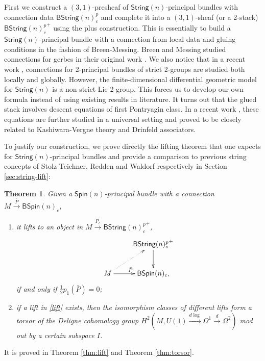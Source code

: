 \documentclass[letterpaper,10pt, oneside]{article} %
\newtheorem{thm}{Theorem}[section]
\newcommand{\bstringnp}{\mathsf{BString}(n)^p_{c}} %
\newcommand{\bstringnpp}{{\mathsf{BString}(n)^p_{c}}^+} %
\newcommand{\String}{\mathsf{String}}%
\newcommand{\Spin}{\mathsf{Spin}}%
\newcommand{\BSpin}{\mathsf{BSpin}}%
\begin{document}
First we  construct a $(3,1)$-presheaf of $\String(n)$-principal bundles with connection data $\bstringnp$ and complete it into a $(3,1)$-sheaf (or a 2-stack) $\bstringnpp$ using the plus construction. This is essentially to build a $\String(n)$-principal bundle with a connection from local data and gluing conditions in the fashion of Breen-Messing. Breen and Messing studied connections for gerbes in their original work  \cite{breen-messing}. We also notice that in a recent work \cite{waldorf:global},  connections for 2-principal bundles of strict 2-groups are studied both locally and globally. However, the finite-dimensional differential geometric model for $\String(n)$ is a non-strict Lie 2-group. This forces us to develop our own formula instead of using existing results in literature.
It turns out that the glued stack involves descent equations of first Pontryagin class. In a recent work \cite{AFXZ}, these equations are further studied in a universal setting and proved to be closely related to Kashiwara-Vergne theory and Drinfeld associators.

To justify our construction, we prove directly the lifting theorem that one
expects for $\String(n)$-principal bundles and provide a comparison
to previous string concepts of Stolz-Teichner, Redden and Waldorf
respectively in Section \ref{sec:string-lift}:

\begin{thm} \label{thm:main}
Given a $\Spin(n)$-principal bundle with a connection $M\xrightarrow{\bar{P}} \BSpin(n)_{c}$,
\begin{enumerate}
    \item[\rm(i)] it lifts to an object in $M\xrightarrow{P_{c}}{\bstringnp}^+$,
\begin{equation}\label{lift}
  \xymatrix{ & {\bstringnp}^+ \ar[d] \\
M \ar@{.>}[ur] \ar[r]^{\bar{P}} & \BSpin(n)_{c},
}
\end{equation}
if and only if $\frac{1}{2} p_1(\bar{P})=0$;

    \item[\rm(ii)] if a lift in \eqref{lift} exists, then the isomorphism classes of different lifts form a torsor of the Deligne cohomology group $H^2(M, \underline{U(1)} \xrightarrow{d\log} \Omega^1\xrightarrow{d}\Omega^2)$ mod out by a certain subspace $I$.
\end{enumerate}
\end{thm}
It is proved in Theorem \ref{thm:lift} and Theorem \ref{thm:torsor}.
\end{document}
